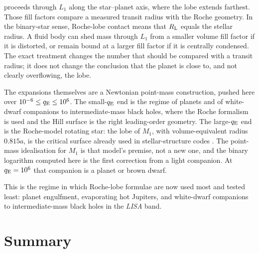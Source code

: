 \documentclass[twocolumn]{aastex702}
\newcommand{\qE}{q_{\rm E}}
\newcommand{\RL}{R_{\rm L}}
\begin{document}
proceeds through $L_1$ along the star--planet axis, where the lobe extends farthest. Those fill factors compare a measured transit radius with the Roche geometry. In the binary-star sense, Roche-lobe contact means that $\RL$ equals the stellar radius. A fluid body can shed mass through $L_1$ from a smaller volume fill factor if it is distorted, or remain bound at a larger fill factor if it is centrally condensed. The exact treatment changes the number that should be compared with a transit radius; it does not change the conclusion that the planet is close to, and not clearly overflowing, the lobe.

The expansions themselves are a Newtonian point-mass construction, pushed here over $10^{-6}\le\qE\le10^6$. The small-$\qE$ end is the regime of planets and of white-dwarf companions to intermediate-mass black holes, where the Roche formalism is used and the Hill surface is the right leading-order geometry. The large-$\qE$ end is the Roche-model rotating star: the lobe of $M_1$, with volume-equivalent radius $0.815a$, is the critical surface already used in stellar-structure codes \citep{Paxton2019,Maeder2009}. The point-mass idealisation for $M_1$ is that model's premise, not a new one, and the binary logarithm computed here is the first correction from a light companion. At $\qE=10^{6}$ that companion is a planet or brown dwarf.

This is the regime in which Roche-lobe formulae are now used most and tested least: planet engulfment, evaporating hot Jupiters, and white-dwarf companions to intermediate-mass black holes in the {\em LISA} band.

\section{Summary}\label{sec:summary}
\end{document}

